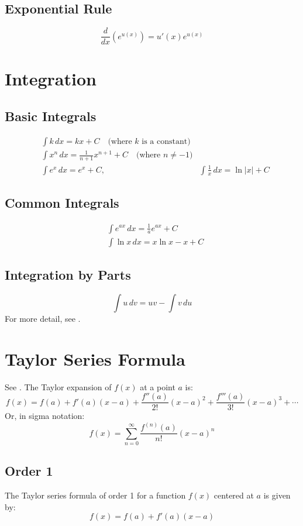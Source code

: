 \documentclass[11pt,a4paper]{book}
\theoremstyle{definition}\newtheorem{definition}{Definition}
\theoremstyle{definition}\newtheorem{fact}{Fact}
\theoremstyle{definition}\newtheorem{remark}{Remark}
\theoremstyle{definition}\newtheorem{ex}{Ex.}
\theoremstyle{definition}\newtheorem{project}{Project}
\theoremstyle{definition}\newtheorem{problem}{Problem}
\theoremstyle{definition}\newtheorem{example}{Example}
\numberwithin{theorem}{section}
\numberwithin{corollary}{chapter}
\numberwithin{assumption}{chapter}
\numberwithin{definition}{chapter}
\numberwithin{prop}{chapter}
\numberwithin{notation}{chapter}
\numberwithin{problem}{chapter}
\numberwithin{example}{chapter}
\numberwithin{fact}{chapter}
\numberwithin{ex}{chapter}
\begin{document}
\begin{appendices}
	\subsection*{Exponential Rule}
	\[
	\frac{d}{dx} (e^{u(x)}) = u'(x) e^{u(x)}
	\]
	
	\section{Integration}
	\subsection*{Basic Integrals}
	\begin{align*}
		&\int k \, dx = kx + C \quad \text{(where $k$ is a constant)} \\
		&\int x^n \, dx = \frac{1}{n+1} x^{n+1} + C \quad \text{(where $n \neq -1$)} \\
		&\int e^x \, dx = e^x + C, \ \ \
		&\int \frac{1}{x} \, dx = \ln |x| + C
	\end{align*}
	
	\subsection*{Common Integrals}
	\begin{align*}
		&\int e^{ax} \, dx = \frac{1}{a} e^{ax} + C \\
		&\int \ln x \, dx = x \ln x - x + C
	\end{align*}
	
	\subsection*{Integration by Parts}
	\[
	\int u \, dv = uv - \int v \, du
	\]
	For more detail, see \citet[Ch. 8]{springcamp}.
	
	\section{Taylor Series Formula}
	See \citet[Ch. 8]{springcamp}. The Taylor expansion of $f(x)$ at a point $a$ is:
	\[
	f(x) = f(a) + f'(a)(x - a) + \frac{f''(a)}{2!}(x - a)^2 + \frac{f'''(a)}{3!}(x - a)^3 + \dotsb
	\]
	Or, in sigma notation:
	\[
	f(x) = \sum_{n=0}^{\infty} \frac{f^{(n)}(a)}{n!}(x - a)^n
	\]
	\subsection*{Order 1}
	The Taylor series formula of order 1 for a function $f(x)$ centered at $a$ is given by:
	\[
	f(x) = f(a) + f'(a)(x - a)
	\]
	

\end{appendices}
\end{document}
